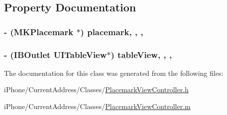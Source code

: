 \subsection{Property Documentation}
\hypertarget{interface_placemark_view_controller_a878263909b0235ddccd1ad6171fc2325}{
\subsubsection[{placemark}]{\setlength{\rightskip}{0pt plus 5cm}-\/ (M\-K\-Placemark $\ast$) placemark\hspace{0.3cm}{\ttfamily [read]}, {\ttfamily [write]}, {\ttfamily [nonatomic]}, {\ttfamily [retain]}}}\label{interface_placemark_view_controller_a878263909b0235ddccd1ad6171fc2325}
\hypertarget{interface_placemark_view_controller_a0eda8ceb83861639e0ee31b816a175c4}{
\subsubsection[{table\-View}]{\setlength{\rightskip}{0pt plus 5cm}-\/ (I\-B\-Outlet U\-I\-Table\-View$\ast$) table\-View\hspace{0.3cm}{\ttfamily [read]}, {\ttfamily [write]}, {\ttfamily [nonatomic]}, {\ttfamily [retain]}}}\label{interface_placemark_view_controller_a0eda8ceb83861639e0ee31b816a175c4}


The documentation for this class was generated from the following files\-:\begin{DoxyCompactItemize}
\item 
i\-Phone/\-Current\-Address/\-Classes/\hyperlink{_placemark_view_controller_8h}{Placemark\-View\-Controller.\-h}\item 
i\-Phone/\-Current\-Address/\-Classes/\hyperlink{_placemark_view_controller_8m}{Placemark\-View\-Controller.\-m}\end{DoxyCompactItemize}
